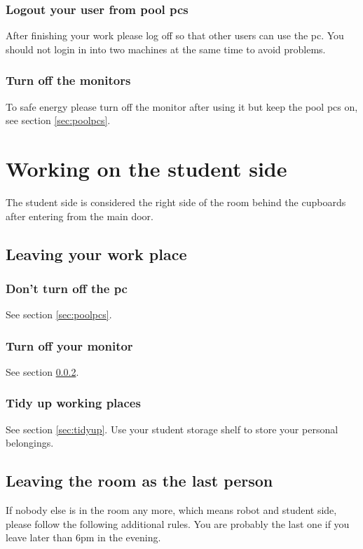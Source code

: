 \subsubsection{Logout your user from pool pcs}
After finishing your work please log off so that other users can use the pc. You should not login in into two machines at the same time to avoid problems.

\subsubsection{Turn off the monitors}\label{sec:monitor}
To safe energy please turn off the monitor after using it but keep the pool pcs on, see section \ref{sec:poolpcs}.


\section{Working on the student side}
The student side is considered the right side of the room behind the cupboards after entering from the main door.

\subsection{Leaving your work place}

\subsubsection{Don't turn off the pc}
See section \ref{sec:poolpcs}.

\subsubsection{Turn off your monitor}
See section \ref{sec:monitor}.

\subsubsection{Tidy up working places}
See section \ref{sec:tidyup}. Use your student storage shelf to store your personal belongings.

\subsection{Leaving the room as the last person}
If nobody else is in the room any more, which means robot and student side, please follow the following additional rules. You are probably the last one if you leave later than 6pm in the evening.

